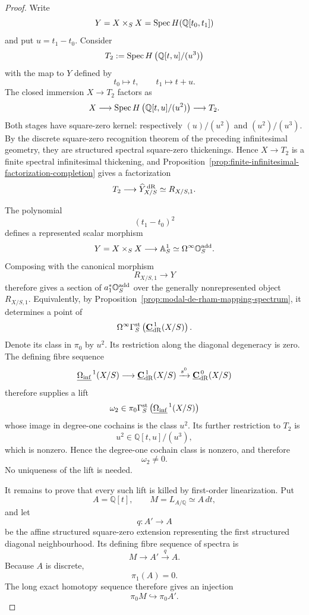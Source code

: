 \begin{proof}
Write
\[
    Y=X\times_SX
    =
    \operatorname{Spec} H(\mathbb Q[t_0,t_1])
\]
and put \(u=t_1-t_0\).  Consider
\[
    T_2
    :=
    \operatorname{Spec} H\left(\mathbb Q[t,u]/(u^3)\right)
\]
with the map to \(Y\) defined by
\[
    t_0\longmapsto t,
    \qquad
    t_1\longmapsto t+u.
\]
The closed immersion \(X\to T_2\) factors as
\[
    X
    \longrightarrow
    \operatorname{Spec} H\left(\mathbb Q[t,u]/(u^2)\right)
    \longrightarrow
    T_2.
\]
Both stages have square-zero kernel: respectively \((u)/(u^2)\) and
\((u^2)/(u^3)\).  By the discrete square-zero recognition theorem of the
preceding infinitesimal geometry, they are structured spectral square-zero
thickenings.  Hence \(X\to T_2\) is a finite spectral infinitesimal thickening,
and Proposition~\ref{prop:finite-infinitesimal-factorization-completion} gives
a factorization
\[
    T_2\longrightarrow
    \widehat Y^{\,\mathrm{dR}}_{X/S}
    \simeq
    R_{X/S,1}.
\]

The polynomial
\[
    (t_1-t_0)^2
\]
defines a represented scalar morphism
\[
    Y=X\times_SX
    \longrightarrow
    \mathbb A^1_S
    \simeq
    \Omega^\infty\mathbb O_S^{\mathrm{add}}.
\]
Composing with the canonical morphism
\[
    R_{X/S,1}\longrightarrow Y
\]
therefore gives a section of \(a_1^*\mathbb O_S^{\mathrm{add}}\) over the generally
nonrepresented object \(R_{X/S,1}\).  Equivalently, by
Proposition~\ref{prop:modal-de-rham-mapping-spectrum}, it determines a point of
\[
    \Omega^\infty
    \Gamma_S^{\mathrm{st}}
    \left(
        \underline{\mathbf C}_{\mathrm{dR}}^{\,1}(X/S)
    \right).
\]
Denote its class in \(\pi_0\) by \(u^2\).  Its restriction along the diagonal
degeneracy is zero.  The defining fibre sequence
\[
    \underline{\Omega_{\mathrm{inf}}}^{\,1}(X/S)
    \longrightarrow
    \underline{\mathbf C}_{\mathrm{dR}}^{\,1}(X/S)
    \xrightarrow{s^0}
    \underline{\mathbf C}_{\mathrm{dR}}^{\,0}(X/S)
\]
therefore supplies a lift
\[
    \omega_2
    \in
    \pi_0\Gamma_S^{\mathrm{st}}
    \left(\underline{\Omega_{\mathrm{inf}}}^{\,1}(X/S)\right)
\]
whose image in degree-one cochains is the class \(u^2\).  Its further
restriction to \(T_2\) is
\[
    u^2\in\mathbb Q[t,u]/(u^3),
\]
which is nonzero.  Hence the degree-one cochain class is nonzero, and therefore
\[
\boxed{
    \omega_2\neq0.
}
\]
No uniqueness of the lift is needed.

It remains to prove that every such lift is killed by first-order
linearization.  Put
\[
    A=\mathbb Q[t],
    \qquad
    M=L_{A/\mathbb Q}\simeq A\,dt,
\]
and let
\[
    q:A'\longrightarrow A
\]
be the affine structured square-zero extension representing the first
structured diagonal neighbourhood.  Its defining fibre sequence of spectra is
\[
    M\longrightarrow A'\xrightarrow{q}A.
\]
Because \(A\) is discrete,
\[
    \pi_1(A)=0.
\]
The long exact homotopy sequence therefore gives an injection
\[
\boxed{
    \pi_0M\hookrightarrow\pi_0A'.
}
\]


\end{proof}

